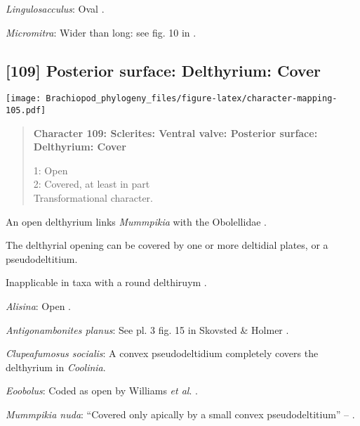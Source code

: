 \documentclass[openany]{book}
\theoremstyle{definition}
\theoremstyle{definition}
\theoremstyle{definition}
\theoremstyle{remark}
\begin{document}
\hypertarget{Lingulosacculus-coding-108}{}
\emph{Lingulosacculus}: Oval
\citep{Williams2000LinguliformeaCraniiformea}.

\hypertarget{Micromitra-coding-108}{}
\emph{Micromitra}: Wider than long: see fig. 10 in
\citet{Balthasar2004Shellstructure}.

\subsection*{{[}109{]} Posterior surface: Delthyrium:
Cover}\label{posterior-surface-delthyrium-cover}

\texttt{[image: Brachiopod\_phylogeny\_files/figure-latex/character-mapping-105.pdf]}

\begin{quote}
\textbf{Character 109: Sclerites: Ventral valve: Posterior surface:
Delthyrium: Cover}

1: Open\\
2: Covered, at least in part\\
Transformational character.
\end{quote}

An open delthyrium links \emph{Mummpikia} with the Obolellidae
\citep{Balthasar2008iMummpikia}.

The delthyrial opening can be covered by one or more deltidial plates,
or a pseudodeltitium.

Inapplicable in taxa with a round delthiruym \citep[generated by
overgrowth of the delthyrial opening by posterolateral parts of the
shell, per][]{Popov1992TheCambrian}.

\hypertarget{Alisina-coding-109}{}
\emph{Alisina}: Open \citep{Topper2013Theoldest}.

\hypertarget{Antigonambonites_planus-coding-109}{}
\emph{Antigonambonites planus}: See pl. 3 fig. 15 in Skovsted \& Holmer
\citeyearpar{Skovsted2005EarlyCambrian}.

\hypertarget{Clupeafumosus_socialis-coding-109}{}
\emph{Clupeafumosus socialis}: A convex pseudodeltidium completely
covers the delthyrium in \emph{Coolinia}.

\hypertarget{Eoobolus-coding-109}{}
\emph{Eoobolus}: Coded as open by Williams \emph{et al}.
\citeyearpar{Williams1998Thediversity}.

\hypertarget{Mummpikia_nuda-coding-109}{}
\emph{Mummpikia nuda}: ``Covered only apically by a small convex
pseudodeltitium'' -- \citet{Holmer2018Evolutionarysignificance}.
\end{document}
